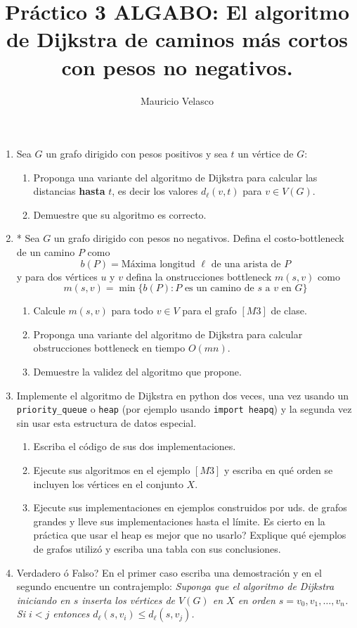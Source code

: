 \documentclass[12pt, a4paper]{article}
\date{}
\begin{document}
\title{Pr\'actico 3 ALGABO: El algoritmo de Dijkstra de caminos m\'as cortos con pesos no negativos.}
\author{Mauricio Velasco}
\maketitle{}
\begin{enumerate} 

\item Sea $G$ un grafo dirigido con pesos positivos y sea $t$ un v\'ertice de $G$:
\begin{enumerate}
\item  Proponga una variante del algoritmo de Dijkstra para calcular las distancias {\bf hasta } $t$, es decir los valores $d_{\ell}(v,t)$ para $v\in V(G)$. 
\item Demuestre que su algoritmo es correcto.
\end{enumerate}

\item * Sea $G$ un grafo dirigido con pesos no negativos. Defina el costo-bottleneck de un camino $P$ como 
\[b(P)=\text{M\'axima longitud $\ell$ de una arista de $P$}\]
y para dos v\'ertices $u$ y $v$ defina la onstrucciones bottleneck $m(s,v)$ como
\[m(s,v)=\min\{b(P): \text{$P$ es un camino de $s$ a $v$ en $G$}\}\]
\begin{enumerate}
\item Calcule $m(s,v)$ para todo $v\in V$ para el grafo $[M3]$ de clase.
\item Proponga una variante del algoritmo de Dijkstra para calcular obstrucciones bottleneck en tiempo $O(mn)$.
\item Demuestre la validez del algoritmo que propone.
\end{enumerate}

\item Implemente el algoritmo de Dijkstra en python dos veces, una vez usando un \verb!priority_queue! o \verb!heap! (por ejemplo usando \verb!import heapq!) y la segunda vez sin usar esta estructura de datos especial.
\begin{enumerate}
\item Escriba el c\'odigo de sus dos implementaciones.
\item Ejecute sus algoritmos en el ejemplo $[M3]$ y escriba en qu\'e orden se incluyen los v\'ertices en el conjunto $X$.
\item Ejecute sus implementaciones en ejemplos construidos por uds. de grafos grandes y lleve sus implementaciones hasta el l\'imite. Es cierto en la pr\'actica que usar el heap es mejor que no usarlo? Explique qu\'e ejemplos de grafos utiliz\'o y escriba una tabla con sus conclusiones.
\end{enumerate}

\item Verdadero \'o Falso? En el primer caso escriba una demostraci\'on y en el segundo encuentre un contrajemplo: {\it Suponga que el algoritmo de Dijkstra iniciando en $s$ inserta los v\'ertices de $V(G)$ en $X$ en orden  $s=v_0,v_1,\dots, v_n$. Si $i<j$ entonces $d_{\ell}(s,v_i)\leq d_{\ell}(s,v_j)$.}
\end{enumerate}
\end{document}
